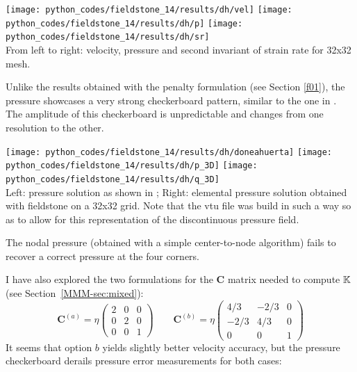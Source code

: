 \begin{center}
\texttt{[image: python\_codes/fieldstone\_14/results/dh/vel]}
\texttt{[image: python\_codes/fieldstone\_14/results/dh/p]}
\texttt{[image: python\_codes/fieldstone\_14/results/dh/sr]}\\
{\captionfont From left to right: velocity, pressure and second invariant 
of strain rate for 32x32 mesh.}
\end{center}

Unlike the results obtained with the penalty formulation (see Section \ref{f01}),
the pressure showcases a very strong checkerboard pattern, similar to the one 
in \cite{dohu03}. The amplitude of this checkerboard is unpredictable 
and changes from one resolution to the other.

\begin{center}
\texttt{[image: python\_codes/fieldstone\_14/results/dh/doneahuerta]}
\texttt{[image: python\_codes/fieldstone\_14/results/dh/p\_3D]}
\texttt{[image: python\_codes/fieldstone\_14/results/dh/q\_3D]}\\
{\captionfont Left: pressure solution as shown in \cite{dohu03}; Right: elemental 
pressure solution obtained with fieldstone on a 32x32 grid. 
Note that the vtu file was build in such a way so as to allow for 
this representation of the discontinuous pressure field.}
\end{center}

The nodal pressure (obtained with a simple center-to-node algorithm)
fails to recover a correct pressure at the four corners.

I have also explored the two formulations for the ${\bm C}$ matrix needed to 
compute ${\mathbb{K}}$ (see Section~\ref{MMM-sec:mixed}):
\[
{\bm C}^{(a)}= \eta 
\left(
\begin{array}{ccc}
2 & 0 & 0 \\
0 & 2 & 0 \\
0 & 0 & 1
\end{array}
\right)
\qquad
{\bm C}^{(b)}= \eta
\left(
\begin{array}{ccc}
4/3 & -2/3 & 0 \\
-2/3 & 4/3 & 0 \\
0 & 0 & 1
\end{array}
\right)
\]
It seems that option $b$ yields slightly better velocity accuracy, but the pressure 
checkerboard derails pressure error measurements for both cases:


